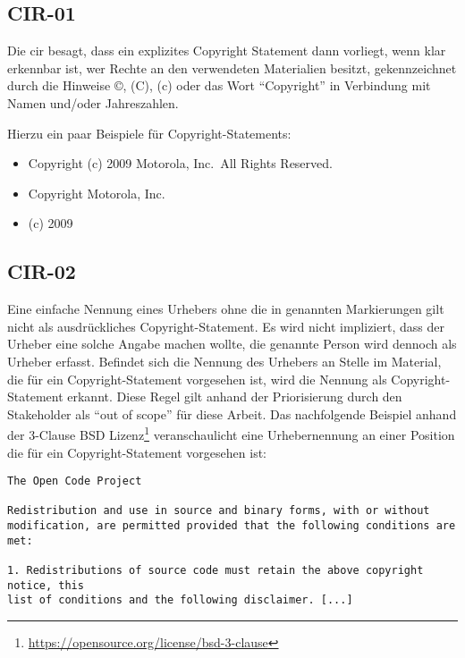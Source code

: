 \subsection{CIR-01}\label{subsec:cir-01}

Die \gls{cir} besagt, dass ein explizites Copyright Statement dann vorliegt, wenn klar erkennbar ist, wer Rechte an den verwendeten Materialien besitzt, gekennzeichnet durch die Hinweise ©, (C), (c) oder das Wort \enquote{Copyright} in Verbindung mit Namen und/oder Jahreszahlen.

Hierzu ein paar Beispiele für Copyright-Statements:
\begin{itemize}
    \item Copyright (c) 2009 Motorola, Inc.\ All Rights Reserved.
    \item Copyright Motorola, Inc.
    \item (c) 2009
\end{itemize}


\subsection{CIR-02}\label{subsec:cir-02}

Eine einfache Nennung eines Urhebers ohne die in  genannten Markierungen gilt nicht als ausdrückliches Copyright-Statement.
Es wird nicht impliziert, dass der Urheber eine solche Angabe machen wollte, die genannte Person wird dennoch als Urheber erfasst.
Befindet sich die Nennung des Urhebers an Stelle im Material, die für ein Copyright-Statement vorgesehen ist, wird die Nennung als Copyright-Statement erkannt.
Diese Regel gilt anhand der Priorisierung durch den Stakeholder als \enquote{out of scope} für diese Arbeit.
Das nachfolgende Beispiel anhand der 3-Clause BSD Lizenz\footnote{\url{https://opensource.org/license/bsd-3-clause}} veranschaulicht eine Urhebernennung an einer Position die für ein Copyright-Statement vorgesehen ist:

\begin{lstlisting}[numbers=none, keepspaces=true]
The Open Code Project

Redistribution and use in source and binary forms, with or without
modification, are permitted provided that the following conditions are met:

1. Redistributions of source code must retain the above copyright notice, this
list of conditions and the following disclaimer. [...]
\end{lstlisting}

